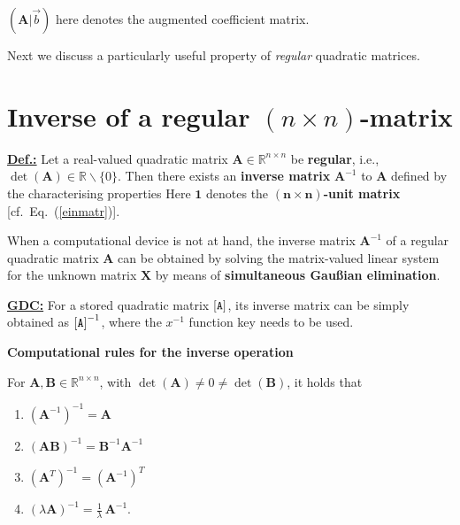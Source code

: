\noindent
$(\mathbf{A}|\vec{b})$ here denotes the augmented coefficient 
matrix.

\medskip
\noindent
Next we discuss a particularly useful property of \emph{regular} 
quadratic matrices.

\section[Inverse of a regular $(n\times n)$-matrix]%
{Inverse of a regular $(n\times n)$-matrix}

\noindent
\underline{\bf Def.:}
Let a real-valued quadratic matrix $\mathbf{A} \in
\mathbb{R}^{n \times n}$ be {\bf regular}, i.e., $\det(\mathbf{A}) 
\in \mathbb{R}\backslash\{0\}$. Then there exists an {\bf inverse 
matrix} $\mathbf{A}^{-1}$ to $\mathbf{A}$ defined by the 
characterising properties
%
\be
{}
\ee
%
Here $\mathbf{1}$ denotes the $\boldsymbol{(n \times n)}${\bf -unit matrix} [cf.\ Eq.~(\ref{einmatr})].

\medskip
\noindent
When a computational device is not at hand, the inverse matrix 
$\mathbf{A}^{-1}$ of a regular quadratic matrix $\mathbf{A}$ can 
be obtained by solving the matrix-valued linear system
%
\be
{} \stackrel{!}{=} 
\ee
%
for the unknown matrix $\mathbf{X}$ by means of {\bf simultaneous 
Gau\ss ian elimination}.

\medskip
\noindent
\underline{\bf GDC:} For a stored quadratic matrix ${\tt [A]}$, 
its inverse matrix can be simply obtained as ${\tt [A]}^{-1}$, 
where the $x^{-1}$ function key needs to be used.

\pagebreak
\medskip
\noindent
{\bf Computational rules for the inverse operation}

\nopagebreak
\noindent
For $\mathbf{A},\mathbf{B} \in \mathbb{R}^{n \times n}$,
with $\det(\mathbf{A}) \neq 0 \neq \det(\mathbf{B})$, it holds that

\begin{enumerate}
\item $(\mathbf{A}^{-1})^{-1} = \mathbf{A}$
\item $(\mathbf{A}\mathbf{B})^{-1}
= \mathbf{B}^{-1}\mathbf{A}^{-1}$
\item $(\mathbf{A}^{T})^{-1} = (\mathbf{A}^{-1})^{T}$
\item $\displaystyle (\lambda\mathbf{A})^{-1}
= \frac{1}{\lambda}\,\mathbf{A}^{-1}$.
\end{enumerate}

